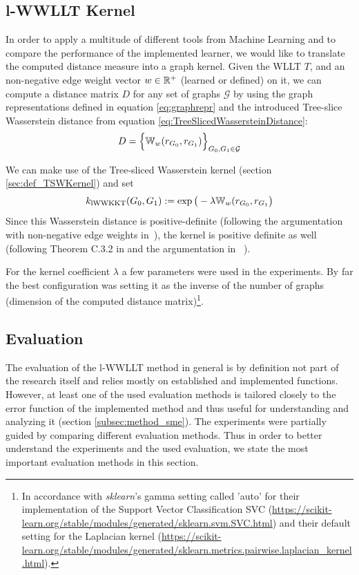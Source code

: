 \subsection{l-WWLLT Kernel} \label{subsec:lWWLLTkernel}
	
	In order to apply a multitude of different tools from Machine Learning and to compare the performance of the implemented learner, we would like to translate the computed distance measure into a graph kernel.
	Given the WLLT $T$, and an non-negative edge weight vector $w\in\mathbb{R}^+$ (learned or defined) on it, we can compute a distance matrix $D$ for any set of graphs $\mathcal{G}$ by using the graph representations defined in equation \ref{eq:graphrepr} and the introduced Tree-slice Wasserstein distance from equation \ref{eq:TreeSlicedWassersteinDistance}:
	\[ D = \Big\{ \mathbb{W}_{w}( r_{G_0}, r_{G_1} ) \Big\}_{G_0, G_1 \in\mathcal{G}} \]	
	
	We can make use of the Tree-sliced Wasserstein kernel (section \ref{sec:def_TSWKernel}) and set
	\[ k_{\text{lWWKKT}}(G_0, G_1) := \exp\big( -\lambda \mathbb{W}_{w}( r_{G_0}, r_{G_1}  \big) \]	
	Since this Wasserstein distance is positive-definite (following the argumentation with non-negative edge weights in~\cite{2019_Le_NIPS}),
	the kernel is positive definite as well (following Theorem C.3.2 in \cite{2017_Bollobas_BOOK} and the argumentation in ~\cite{1938_Schoenberg_CONF}).
		
	For the kernel coefficient $\lambda$ a few parameters were used in the experiments.
	By far the best configuration was setting it as the inverse of the number of graphs (dimension of the computed distance matrix)\footnote{In accordance with \textit{sklearn}'s gamma setting called 'auto' for their implementation of the Support Vector Classification SVC (\url{https://scikit-learn.org/stable/modules/generated/sklearn.svm.SVC.html}) and their default setting for the Laplacian kernel (\url{https://scikit-learn.org/stable/modules/generated/sklearn.metrics.pairwise.laplacian_kernel.html}).}.
		
\subsection{Evaluation}\label{sec:method_eval_ewl}
	
	The evaluation of the l-WWLLT method in general is by definition not part of the research itself and relies mostly on established and implemented functions.
	However, at least one of the used evaluation methods is tailored closely to the error function of the implemented method and thus useful for understanding and analyzing it (section \ref{subsec:method_sme}).
	The experiments were partially guided by comparing different evaluation methods.
	Thus in order to better understand the experiments and the used evaluation, we state the most important evaluation methods in this section.
	
